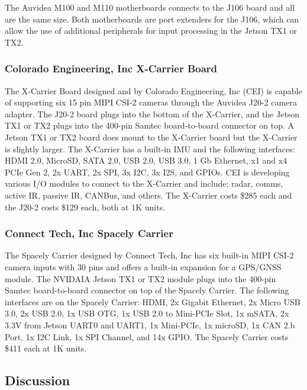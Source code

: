The Auvidea M100 and M110 motherboards connects to the J106 board and all are the same 
size. Both motherboards are port extenders for the J106, which can allow the use of 
additional peripherals for input processing in the Jetson TX1 or 
TX2\cite{AuvideaMBoards}. \\

\subsubsection{Colorado Engineering, Inc X-Carrier Board}

The X-Carrier Board designed and by Colorado Engineering, Inc (CEI) is capable of 
supporting six 15 pin MIPI CSI-2 cameras through the Auvidea J20-2 camera adapter. The 
J20-2 board plugs into the bottom of the X-Carrier, and the Jetson TX1 or TX2 plugs 
into the 400-pin Samtec board-to-board connector on top. A Jetson TX1 or TX2 board does 
mount to the X-Carrier board but the X-Carrier is slightly larger. The X-Carrier has a built-in IMU 
and the following interfaces: HDMI 2.0, MicroSD, SATA 2.0, USB 2.0, USB 3.0, 1 Gb 
Ethernet, x1 and x4 PCIe Gen 2, 2x UART, 2x SPI, 3x I2C, 3x I2S, and GPIOs. CEI is  
developing various I/O modules to connect to the X-Carrier and include: radar, comms, 
active IR, passive IR, CANBus, and others\cite{CEIXpdf, J20TechRef, AuvideaJ20}. The X-Carrier costs \$285 each 
and the J20-2 costs \$129 each, both at 1K units\cite{SpacelyQuote, AuvideaQuote}. \\
	
\subsubsection{Connect Tech, Inc Spacely Carrier}

The Spacely Carrier designed by Connect Tech, Inc has six built-in MIPI CSI-2 camera 
inputs with 30 pins and offers a built-in expansion for a GPS/GNSS module. The NVIDAIA 
Jetson TX1 or TX2 module plugs into the 400-pin Samtec board-to-board connector on top 
of the Spacely Carrier. The following interfaces are on the Spacely Carrier: HDMI, 2x 
Gigabit Ethernet, 2x Micro USB 3.0, 2x USB 2.0, 1x USB OTG, 1x USB 2.0 to Mini-PCIe 
Slot, 1x mSATA, 2x 3.3V from Jetson UART0 and UART1, 1x Mini-PCIe, 1x microSD, 1x CAN 2.b 
Port, 1x I2C Link, 1x SPI Channel, and 14x GPIO\cite{SpacelyUG}. The Spacely Carrier 
costs \$411 each at 1K units.\\

\subsection{Discussion}

